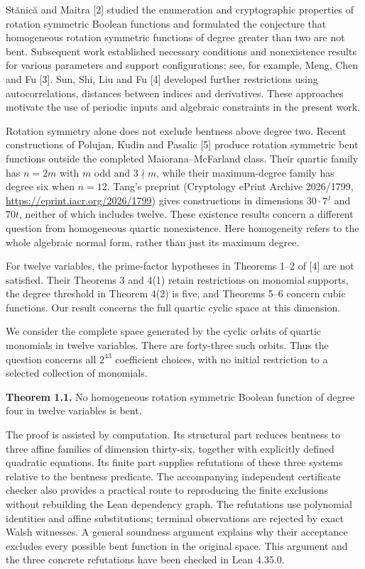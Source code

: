 \documentclass[11pt,a4paper]{article}
\begin{document}
St\u{a}nic\u{a} and Maitra [2] studied the enumeration and cryptographic properties of rotation symmetric Boolean functions and formulated the conjecture that homogeneous rotation symmetric functions of degree greater than two are not bent. Subsequent work established necessary conditions and nonexistence results for various parameters and support configurations; see, for example, Meng, Chen and Fu [3]. Sun, Shi, Liu and Fu [4] developed further restrictions using autocorrelations, distances between indices and derivatives. These approaches motivate the use of periodic inputs and algebraic constraints in the present work.

Rotation symmetry alone does not exclude bentness above degree two. Recent constructions of Polujan, Kudin and Pasalic [5] produce rotation symmetric bent functions outside the completed Maiorana--McFarland class. Their quartic family has $n=2m$ with $m$ odd and $3\nmid m$, while their maximum-degree family has degree six when $n=12$. Tang's preprint (Cryptology ePrint Archive 2026/1799, \url{https://eprint.iacr.org/2026/1799}) gives constructions in dimensions $30\cdot7^j$ and $70t$, neither of which includes twelve. These existence results concern a different question from homogeneous quartic nonexistence. Here homogeneity refers to the whole algebraic normal form, rather than just its maximum degree.

For twelve variables, the prime-factor hypotheses in Theorems 1--2 of [4] are not satisfied. Their Theorems 3 and 4(1) retain restrictions on monomial supports, the degree threshold in Theorem 4(2) is five, and Theorems 5--6 concern cubic functions. Our result concerns the full quartic cyclic space at this dimension.

We consider the complete space generated by the cyclic orbits of quartic monomials in twelve variables. There are forty-three such orbits. Thus the question concerns all $2^{43}$ coefficient choices, with no initial restriction to a selected collection of monomials.

\textbf{Theorem 1.1.} No homogeneous rotation symmetric Boolean function of degree four in twelve variables is bent.

The proof is assisted by computation. Its structural part reduces bentness to three affine families of dimension thirty-six, together with explicitly defined quadratic equations. Its finite part supplies refutations of these three systems relative to the bentness predicate. The accompanying independent certificate checker also provides a practical route to reproducing the finite exclusions without rebuilding the Lean dependency graph. The refutations use polynomial identities and affine substitutions; terminal observations are rejected by exact Walsh witnesses. A general soundness argument explains why their acceptance excludes every possible bent function in the original space. This argument and the three concrete refutations have been checked in Lean 4.35.0.
\end{document}
